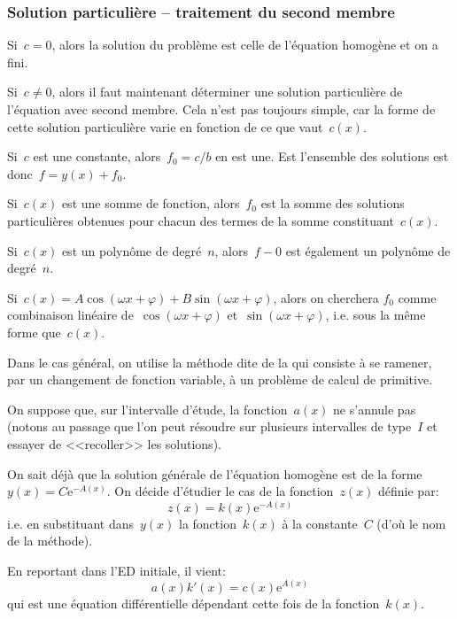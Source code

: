 \medskip
\subsubsection{Solution particulière -- traitement du second membre}

Si~$c=0$, alors la solution du problème est celle de l'équation homogène et on a fini.

\medskip
Si~$c\ne0$, alors il faut maintenant déterminer une solution particulière de l'équation avec
second membre. Cela n'est pas toujours simple, car la forme de cette solution particulière varie 
en fonction de ce que vaut~$c(x)$.

\medskip
Si~$c$ est une constante, alors~$f_0=c/b$ en est une. Est l'ensemble des solutions
est donc~$f=y(x)+f_0$.

\medskip
Si~$c(x)$ est une somme de fonction, alors~$f_0$ est la somme des solutions particulières
obtenues pour chacun des termes de la somme constituant~$c(x)$.

\medskip
Si~$c(x)$ est un polynôme de degré~$n$, alors~$f-0$ est également un polynôme
de degré~$n$.

\medskip
Si~$c(x) = A\cos(\omega x + \varphi) + B \sin(\omega x + \varphi)$, alors on cherchera
$f_0$ comme combinaison linéaire de~$\cos(\omega x + \varphi)$ et~$\sin(\omega x + \varphi)$,
i.e. sous la même forme que~$c(x)$.

\medskip
Dans le cas général, on utilise la méthode dite de la 
qui consiste à se ramener, par un changement de fonction variable, à un problème de calcul de 
primitive.

On suppose que, sur l'intervalle d'étude, la fonction~$a(x)$ ne s'annule pas (notons au passage que
l'on peut résoudre sur plusieurs intervalles de type~$I$ et essayer de <<recoller>> les solutions).

On sait déjà que la solution générale de l'équation homogène est
de la forme~$y(x)= C\mathrm{e}^{-A(x)}$.
On décide d'étudier le cas de la fonction~$z(x)$ définie par:
\begin{equation}
  z(x) = k(x)\mathrm{e}^{- A(x)}
\end{equation}
i.e. en substituant dans~$y(x)$ la fonction~$k(x)$ à la constante~$C$ (d'où le nom de la
méthode).

En reportant dans l'ED initiale, il vient:
\begin{equation}
  a(x)k'(x) = c(x)\mathrm{e}^{A(x)}
\end{equation}
qui est une équation différentielle dépendant cette fois de la fonction~$k(x)$.

